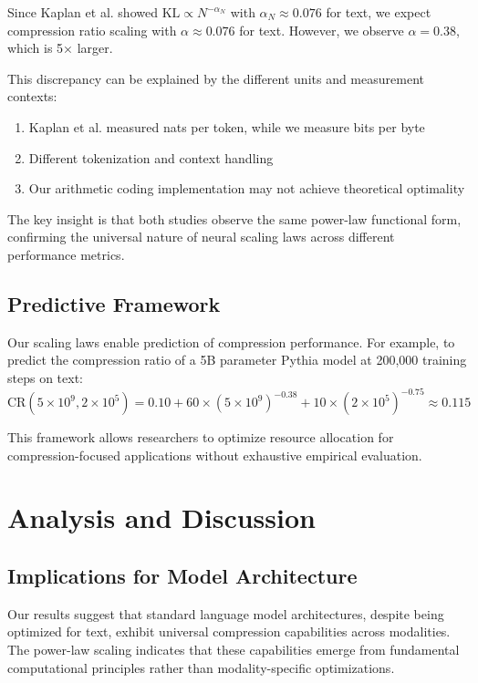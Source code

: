 \documentclass[11pt]{article}
\begin{document}
Since Kaplan et al. showed $\mathrm{KL} \propto N^{-\alpha_N}$ with $\alpha_N \approx 0.076$ for text, we expect compression ratio scaling with $\alpha \approx 0.076$ for text. However, we observe $\alpha = 0.38$, which is 5× larger.

This discrepancy can be explained by the different units and measurement contexts:
\begin{enumerate}
\item Kaplan et al. measured nats per token, while we measure bits per byte
\item Different tokenization and context handling
\item Our arithmetic coding implementation may not achieve theoretical optimality
\end{enumerate}

The key insight is that both studies observe the same power-law functional form, confirming the universal nature of neural scaling laws across different performance metrics.

\subsection{Predictive Framework}

Our scaling laws enable prediction of compression performance. For example, to predict the compression ratio of a 5B parameter Pythia model at 200,000 training steps on text:
\[
\mathrm{CR}(5 \times 10^9, 2 \times 10^5) = 0.10 + 60 \times (5 \times 10^9)^{-0.38} + 10 \times (2 \times 10^5)^{-0.75} \approx 0.115
\]

This framework allows researchers to optimize resource allocation for compression-focused applications without exhaustive empirical evaluation.

\section{Analysis and Discussion}

\subsection{Implications for Model Architecture}

Our results suggest that standard language model architectures, despite being optimized for text, exhibit universal compression capabilities across modalities. The power-law scaling indicates that these capabilities emerge from fundamental computational principles rather than modality-specific optimizations.
\end{document}
